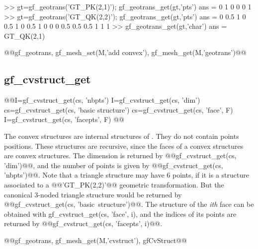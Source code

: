 \begin{cmdexamples}
\begin{matlab}
>> gt=gf_geotrans('GT_PK(2,1)'); gf_geotrans_get(gt,'pts')
ans =
     0     1     0
     0     0     1
>> gt=gf_geotrans('GT_QK(2,2)'); gf_geotrans_get(gt,'pts')
ans =
     0     0.5   1     0     0.5   1     0     0.5   1
     0     0     0     0.5   0.5   0.5   1     1     1
>> gf_geotrans_get(gt,'char')
ans =
GT_QK(2,1)
\end{matlab}
\end{cmdexamples}
\begin{gfseealso}
@@gf_geotrans, gf\_mesh\_set(M,'add convex'), gf_mesh_get(M,'geotrans')@@
\end{gfseealso}
\newpage

\subsection{gf\_cvstruct_get}
\begin{synopsis}
@@\tint I=gf_cvstruct_get(\tcvstruct cs, 'nbpts')
\tint I=gf_cvstruct_get(\tcvstruct cs, 'dim')
\tcvstruct cs=gf_cvstruct_get(\tcvstruct cs, 'basic structure') 
\tcvstruct cs=gf_cvstruct_get(\tcvstruct cs, 'face', \tint F)
\tivec I=gf_cvstruct_get(\tcvstruct cs, 'facepts', \tint F)
@@\end{synopsis}
\begin{cmddescription}
  The convex structures are internal structures of \gf. They do not
  contain points positions. These structures are recursive, since the
  faces of a convex structures are convex structures. The dimension is
  returned by @@gf_cvstruct_get(cs, 'dim')@@, and the number of points
  is given by @@gf_cvstruct_get(cs, 'nbpts')@@. Note that a triangle
  structure may have 6 points, if it is a structure associated to a
  @@'GT_PK(2,2)'@@ geometric transformation. But the canonical 3-noded
  triangle structure would be returned by @@gf_cvstruct_get(cs,
  'basic~structure')@@. The structure of the \textit{ith} face can be
  obtained with gf_cvstruct_get(cs, 'face', i), and the indices of its points are returned by @@gf_cvstruct_get(cs, 'facepts', i)@@.
\end{cmddescription}
\begin{gfseealso}
@@gf_geotrans, gf_mesh_get(M,'cvstruct'), gfCvStruct@@
\end{gfseealso}
\newpage

